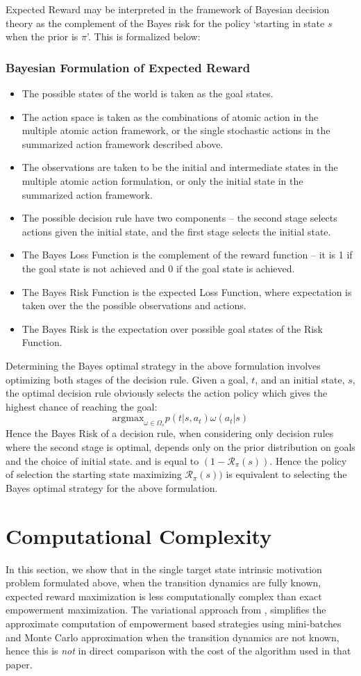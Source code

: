 \documentclass{article}
\begin{document}
Expected Reward may be interpreted in the framework of Bayesian decision theory as the complement of the Bayes risk for the policy `starting in state $s$ when the prior is $\pi$'. This is formalized below: 
\subsubsection{Bayesian Formulation of Expected Reward}
\begin{itemize}
\item The possible states of the world is taken as the goal states.
\item The action space is taken as the combinations of atomic action in the multiple atomic action framework, or the single stochastic actions in the summarized action framework described above.
\item The observations are taken to be the initial and intermediate states in the multiple atomic action formulation, or only the initial state in the summarized action framework.
\item The possible decision rule have two components -- the second stage selects actions given the initial state, and the first stage selects the initial state. 
\item The Bayes Loss Function is the complement of the reward function -- it is 1 if the goal state is not achieved and 0 if the goal state is achieved.
\item The Bayes Risk Function is the expected Loss Function, where expectation is taken over the the possible observations and actions. 
\item The Bayes Risk is the expectation over possible goal states of the Risk Function. 
\end{itemize}
Determining the Bayes optimal strategy in the above formulation involves optimizing both stages of the decision rule. Given a goal, $t$, and an initial state, $s$, the optimal decision rule obviously selects the action policy which gives the highest chance of reaching the goal: 
\[\text{argmax}_{\omega\in\Omega_s} p(t|s,a_t)\omega(a_t|s)\]
Hence the Bayes Risk of a decision rule, when considering only decision rules where the second stage is optimal, depends only on the prior distribution on goals and the choice of initial state. and is equal to $(1-\mathcal{R}_\pi(s))$. Hence the policy of selection the starting state maximizing $\mathcal{R}_\pi(s))$ is equivalent to selecting the Bayes optimal strategy for the above formulation.
\section{Computational Complexity}
In this section, we show that in the single target state intrinsic motivation problem formulated above, when the transition dynamics are fully known, expected reward maximization is less computationally complex than exact empowerment maximization. 
The variational approach from \cite{mohamed2015variational}, simplifies the approximate computation of empowerment based strategies using mini-batches and Monte Carlo approximation when the transition dynamics are not known, hence this is \textit{not} in direct comparison with the cost of the algorithm used in that paper. 
\end{document}
